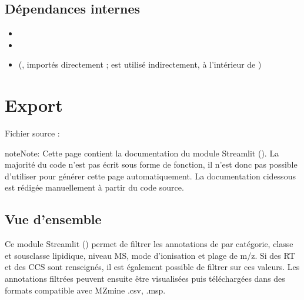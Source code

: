 \documentclass[letterpaper,10pt,english]{sphinxmanual}
\begin{document}
\section{Dépendances internes}
\label{\detokenize{2_BacLipidDB:dependances-internes}}\begin{itemize}
\item {} 
\sphinxAtStartPar
{}

\item {} 
\sphinxAtStartPar
{}

\item {} 
\sphinxAtStartPar
{\hyperref[\detokenize{api:module-config}]{}} (,  importés directement ;  est
utilisé indirectement, à l’intérieur de )

\end{itemize}

\sphinxstepscope


\chapter{Export}
\label{\detokenize{3_Export:export}}\label{\detokenize{3_Export::doc}}
\sphinxAtStartPar
Fichier source : 

\begin{sphinxadmonition}{note}{Note:}
\sphinxAtStartPar
Cette page contient la documentation du module Streamlit ().
La majorité du code n’est pas écrit sous forme de fonction, il n’est donc pas possible d’utiliser 
pour générer cette page automatiquement. La documentation ci\sphinxhyphen{}dessous est rédigée manuellement
à partir du code source.
\end{sphinxadmonition}


\section{Vue d’ensemble}
\label{\detokenize{3_Export:vue-d-ensemble}}
\sphinxAtStartPar
Ce module Streamlit () permet de filtrer les annotations de
 par catégorie, classe et sous\sphinxhyphen{}classe lipidique, niveau MS,
mode d’ionisation et plage de m/z. Si des RT et des CCS sont renseignés,
il est également possible de filtrer sur ces valeurs. Les annotations filtrées peuvent ensuite être visualisées
puis téléchargées dans des formats compatible avec MZmine .csv, .msp.
\end{document}
